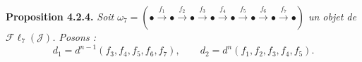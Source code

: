 \medskip\noindent\textbf{Proposition 4.2.4.}\quad
\textit{Soit
$\omega_7=(\mathord\bullet\xrightarrow{f_1}\mathord\bullet
\xrightarrow{f_2}\mathord\bullet\xrightarrow{f_3}\mathord\bullet
\xrightarrow{f_4}\mathord\bullet\xrightarrow{f_5}\mathord\bullet
\xrightarrow{f_6}\mathord\bullet\xrightarrow{f_7}\mathord\bullet)$
un objet de $\mathcal{F}\ell_7(\mathcal J)$. Posons :}
\[
d_1=d^{n-1}(f_3,f_4,f_5,f_6,f_7),
\qquad
d_2=d^n(f_1,f_2,f_3,f_4,f_5).
\]
\endgroup

